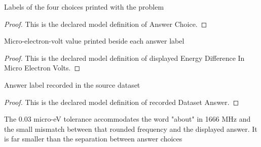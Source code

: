 \begin{definition}
  \label{def:physics:phyx-mini-0577:phyxminiproblems-problemphyxmini0577-answerchoice}
  Labels of the four choices printed with the problem
\end{definition}
\begin{proof}
  This is the declared model definition of Answer Choice.
\end{proof}
\begin{definition}
  \label{def:physics:phyx-mini-0577:phyxminiproblems-problemphyxmini0577-displayedenergydifferenceinmicroelectronvolts}
  Micro-electron-volt value printed beside each answer label
\end{definition}
\begin{proof}
  This is the declared model definition of displayed Energy Difference In Micro Electron Volts.
\end{proof}
\begin{definition}
  \label{def:physics:phyx-mini-0577:phyxminiproblems-problemphyxmini0577-recordeddatasetanswer}
  Answer label recorded in the source dataset
\end{definition}
\begin{proof}
  This is the declared model definition of recorded Dataset Answer.
\end{proof}
\begin{definition}
  \label{def:physics:phyx-mini-0577:phyxminiproblems-problemphyxmini0577-matchesdisplayedenergydifference}
  The 0.03 micro-eV tolerance accommodates the word "about" in 1666 MHz and the small mismatch between that rounded frequency and the displayed answer. It is far smaller than the separation between answer choices
\end{definition}
